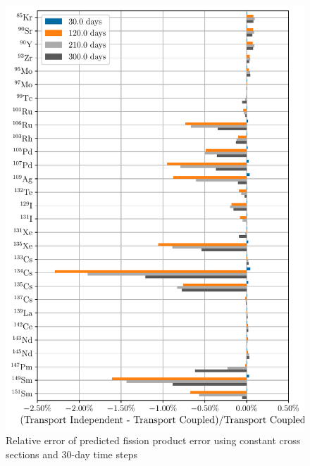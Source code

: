     \begin{figure}[htpb]
        \centering
        \includegraphics[width=\linewidth]{figs/fission_products_constant_xs_predictor_fission_q_months.pdf}
        \caption{Relative error of predicted fission product error using
        constant cross sections and 30-day time steps}
        \label{fig:fp-error-constant-xs-months}
    \end{figure}

